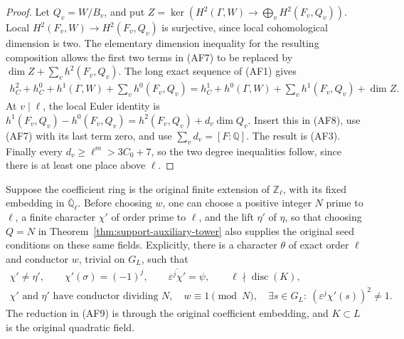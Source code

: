 \begin{proof}
Let $Q_v=W/B_v$, and put
$Z=\ker(H^2(\Gamma,W)\to\bigoplus_vH^2(F_v,Q_v))$.
Local $H^2(F_v,W)\to H^2(F_v,Q_v)$ is surjective, since
local cohomological dimension is two.  The elementary
dimension inequality for the resulting composition
allows the first two terms in (AF7) to be replaced by
$\dim Z+\sum_v h^2(F_v,Q_v)$.  The long exact sequence
of (AF1) gives
\[
 \begin{split}
  h_C^2+h_C^0+h^1(\Gamma,W)+\sum_v h^0(F_v,Q_v)
   =h_C^1+h^0(\Gamma,W)+\sum_v h^1(F_v,Q_v)+\dim Z.
 \end{split}                                             \tag{AF8}
\]
At $v\mid\ell$, the local Euler identity is
$h^1(F_v,Q_v)-h^0(F_v,Q_v)=h^2(F_v,Q_v)+d_v\dim Q_v$.
Insert this in (AF8), use (AF7) with its last term zero,
and use $\sum_vd_v=[F:\mathbb Q]$.  The result is (AF3).
Finally every $d_v\geq\ell^m>3C_0+7$, so the two
degree inequalities follow, since there is at least
one place above $\ell$.
\end{proof}

\begin{proposition}
\label{prop:support-auxiliary-seed}
Suppose the coefficient ring is the original finite extension
of $\mathbb Z_\ell$, with its fixed embedding in
$\overline{\mathbb Q}_\ell$.  Before choosing $w$, one can
choose a positive integer $N$ prime to $\ell$, a finite
character $\chi'$ of order prime to $\ell$, and the lift
$\eta'$ of $\eta$, so that choosing $Q=N$ in
Theorem~\ref{thm:support-auxiliary-tower} also supplies
the original seed conditions on these same fields.
Explicitly, there is a character $\theta$ of exact order
$\ell$ and conductor $w$, trivial on $G_L$, such that
\[
 \begin{gathered}
 \chi'\ne\eta',\qquad
 \chi'(\sigma)=(-1)^j,\qquad
 \overline{\varepsilon^j\chi'}=\psi,\qquad
 \ell\nmid\operatorname{disc}(K),                         \tag{AF9}\\
 \chi'\text{ and }\eta'\text{ have conductor dividing }N,
 \quad w\equiv1\pmod N,
 \quad \exists s\in G_L:\ (\varepsilon^j\chi'(s))^2\ne1.
 \end{gathered}
\]
The reduction in (AF9) is through the original coefficient
embedding, and $K\subset L$ is the original quadratic field.
\end{proposition}

